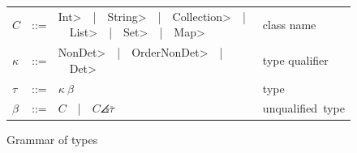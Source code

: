 % 
% 
% 
% 





\begin{figure}
  \newcommand{\bnfalt}{\ \ |\ \ }
  \begin{tabular}{lcll}
    $C$ & ::= & \<Int>\bnfalt \<String>\bnfalt \<Collection>\bnfalt \<List>\bnfalt \<Set>\bnfalt \<Map> & class name \\
    $\kappa$ & ::= & \<NonDet>\bnfalt \<OrderNonDet>\bnfalt\<Det> & type qualifier \\
    $\tau$ & ::= & $\kappa\ \beta$ & \mbox{type} \\
    $\beta$ & ::= & $C$\bnfalt $C\angles{\overline{\tau}}$ 
    & \mbox{unqualified type}
  \end{tabular}
  \caption{Grammar of types}
  \label{fig:grammar}
\end{figure}

